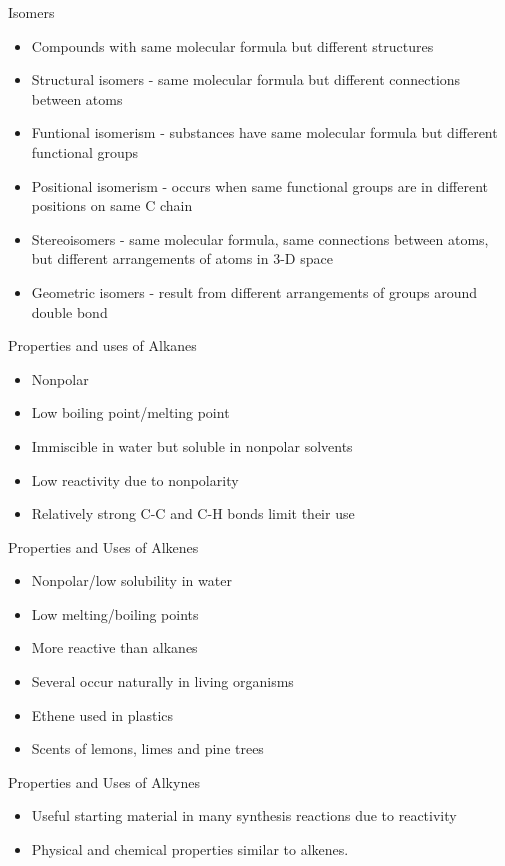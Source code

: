 \documentclass[../hchem.tex]{subfiles}
\begin{document}
Isomers 
\begin{itemize}
    \item Compounds with same molecular formula but different structures 
    \item Structural isomers - same molecular formula but different connections between atoms 
    \item Funtional isomerism - substances have same molecular formula but different functional groups 
    \item Positional isomerism - occurs when same functional groups are in different positions on same C chain 
    \item Stereoisomers - same molecular formula, same connections between atoms, but different arrangements of atoms in 3-D space 
    \item Geometric isomers - result from different arrangements of groups around double bond 
\end{itemize}

Properties and uses of Alkanes 
\begin{itemize}
    \item Nonpolar 
    \item Low boiling point/melting point 
    \item Immiscible in water but soluble in nonpolar solvents 
    \item Low reactivity due to nonpolarity 
    \item Relatively strong C-C and C-H bonds limit their use 
\end{itemize}

Properties and Uses of Alkenes 
\begin{itemize}
    \item Nonpolar/low solubility in water 
    \item Low melting/boiling points 
    \item More reactive than alkanes 
    \item Several occur naturally in living organisms 
    \item Ethene used in plastics 
    \item Scents of lemons, limes and pine trees 
\end{itemize}

Properties and Uses of Alkynes 
\begin{itemize}
    \item Useful starting material in many synthesis reactions due to reactivity
    \item Physical and chemical properties similar to alkenes.
\end{itemize}
\end{document}
